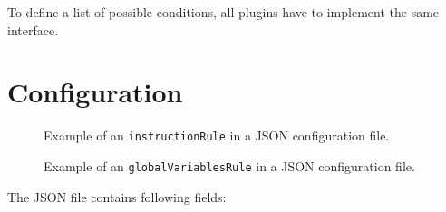 To define a list of possible conditions, all plugins have to implement the same
interface.

\section{Configuration}


\begin{figure}[h]

\caption{Example of an \texttt{instructionRule} in a JSON configuration file.}
\label{fig:json_example}
\end{figure}

\begin{figure}[h]

\caption{Example of an \texttt{globalVariablesRule} in a JSON configuration file.}
\label{fig:json_example2}
\end{figure}

The JSON file contains following fields:

